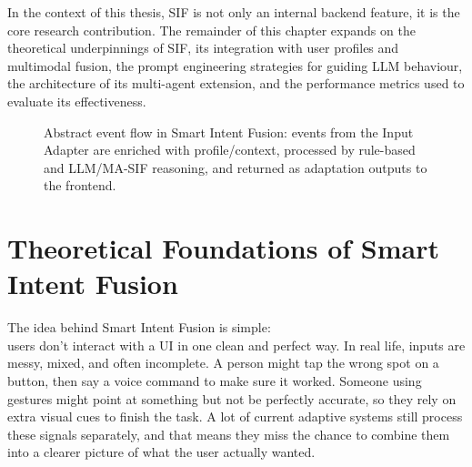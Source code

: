In the context of this thesis, SIF is not only an internal backend feature, it is the core research contribution.
The remainder of this chapter expands on the theoretical underpinnings of SIF, its integration with user profiles and multimodal fusion, the prompt engineering strategies for guiding LLM behaviour, the architecture of its multi-agent extension, and the performance metrics used to evaluate its effectiveness.
\begin{figure}[h]
\centering
{}
\caption{Abstract event flow in Smart Intent Fusion: events from the Input Adapter are enriched with profile/context, processed by rule-based and LLM/MA-SIF reasoning, and returned as adaptation outputs to the frontend.}
\label{fig:sif-event-flow}
\end{figure}

\section{Theoretical Foundations of Smart Intent Fusion}
The idea behind Smart Intent Fusion is simple:
\\ users don’t interact with a UI in one clean and perfect way. In real life, inputs are messy, mixed, and often incomplete. A person might tap the wrong spot on a button, then say a voice command to make sure it worked. Someone using gestures might point at something but not be perfectly accurate, so they rely on extra visual cues to finish the task. A lot of current adaptive systems still process these signals separately, and that means they miss the chance to combine them into a clearer picture of what the user actually wanted.

